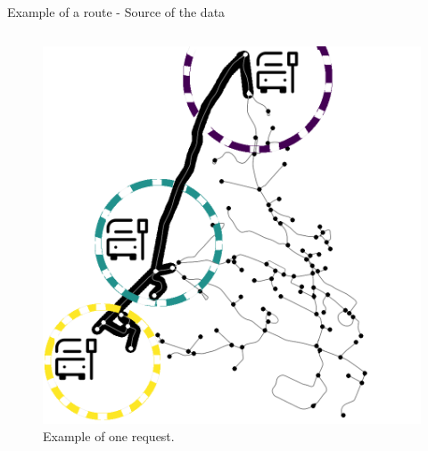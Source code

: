 \documentclass[Ligatures=TeX,table,svgnames,usetotalslideindicator,compress,10pt,aspectratio=169]{beamer}
\begin{document}
\begin{frame}{Example of a route -  Source of the data} 
\begin{columns}        

\begin{column}{0.5\textwidth}
   \begin{figure}[!h]
        \centering
        \includegraphics[width=\textwidth]{images/bus_stops_data.png}
        \caption{Example of one request.}
      \end{figure}


\end{column}
\end{columns}
\end{frame}
\end{document}
